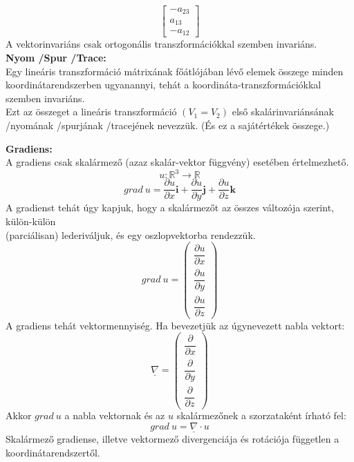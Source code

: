 \documentclass[11pt,a4paper]{article}
\begin{document}
\begin{tcolorbox}[colback=red!5!white,colframe=red!60!black,title= 3. Mátrix vektorinvariánsa és nyoma (trace{,} spur)]
$$\begin{bmatrix}
        -a_{23}\\
        a_{13}\\
        -a_{12}
    \end{bmatrix}$$
    A vektorinvariáns csak ortogonális transzformációkkal szemben invariáns. \\
    \textbf{Nyom /Spur /Trace:} \\
    Egy lineáris transzformáció mátrixának főátlójában lévő elemek összege minden koordinátarendszerben ugyanannyi, tehát a koordináta-transzformációkkal szemben invariáns. \\
    Ezt az összeget a lineáris transzformáció $(V_{1}=V_{2})$ első skalárinvariánsának /nyomának /spurjának /tracejének nevezzük. (És ez a sajátértékek összege.)
    \end{tcolorbox}

    \begin{tcolorbox}[colback=red!5!white,colframe=red!60!black,title= 4. Gradiens{,} divergencia{,} rotáció]
    \textbf{Gradiens:} \\
    A gradiens csak skalármező (azaz skalár-vektor függvény) esetében értelmezhető.
    $$u:\mathbb{R}^3 \rightarrow \mathbb{R}$$
    $$grad\ u = \frac{\partial u}{\partial x}\textbf{i} + \frac{\partial u}{\partial y}\textbf{j} + \frac{\partial u}{\partial z}\textbf{k}$$
    A gradienst tehát úgy kapjuk, hogy a skalármezőt az összes változója szerint, külön-külön \\
    (parciálisan) lederiváljuk, és egy oszlopvektorba rendezzük.
    $$grad\ u =
    \begin{pmatrix}
        \dfrac{\partial u}{\partial x}\\[8pt]
        \dfrac{\partial u}{\partial y}\\[8pt]
        \dfrac{\partial u}{\partial z}
    \end{pmatrix}$$
    A gradiens tehát vektormennyiség. Ha bevezetjük az úgynevezett nabla vektort:
    $$\underline{\nabla} = 
    \begin{pmatrix}
        \dfrac{\partial}{\partial x}\\[8pt]
        \dfrac{\partial}{\partial y}\\[8pt]
        \dfrac{\partial}{\partial z}
    \end{pmatrix}$$
    Akkor $grad\ u$ a nabla vektornak és az $u$ skalármezőnek a szorzataként írható fel:
    $$grad\ u = \underline{\nabla} \cdot u$$
    Skalármező gradiense, illetve vektormező divergenciája és rotációja független a koordinátarendszertől.


\end{tcolorbox}
\end{document}
